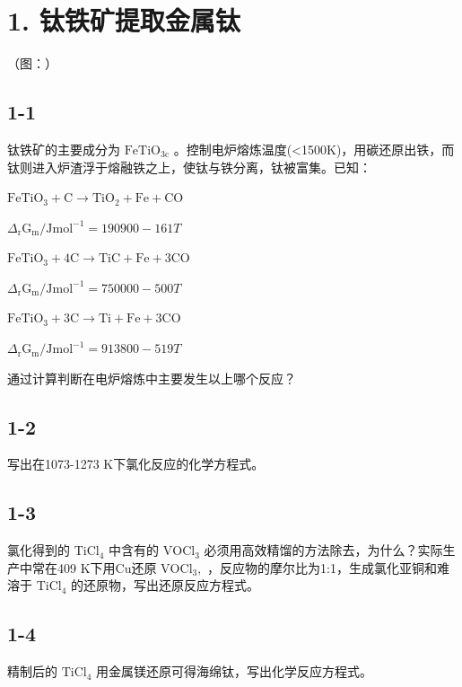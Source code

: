 \section*{1. 钛铁矿提取金属钛}
（图：）

\subsection*{1-1}
钛铁矿的主要成分为 $\mathrm { F e T i O _ { 3 \mathrm { c } } }$ 。控制电炉熔炼温度(<1500K)，⽤碳还原出铁，⽽钛则进⼊炉渣浮于熔融铁之上，使钛与铁分离，钛被富集。已知：

$
\mathrm{FeTiO} _ {3} + \mathrm{C} \rightarrow \mathrm{TiO} _ {2} + \mathrm{Fe} + \mathrm{CO}
$

$
\Delta_ {\mathrm{r}} \mathrm{G} _ {\mathrm{m}} / \mathrm{J} \mathrm{mol} ^ {- 1} = 1 9 0 9 0 0 - 1 6 1 T
$

$
\mathrm{FeTiO} _ {3} + 4 \mathrm{C} \rightarrow \mathrm{TiC} + \mathrm{Fe} + 3 \mathrm{CO}
$

$
\Delta_ {\mathrm{r}} \mathrm{G} _ {\mathrm{m}} / \mathrm{J} \mathrm{mol} ^ {- 1} = 7 5 0 0 0 0 - 5 0 0 T
$

$
\mathrm{FeTiO} _ {3} + 3 \mathrm{C} \rightarrow \mathrm{Ti} + \mathrm{Fe} + 3 \mathrm{CO}
$

$
\Delta_ {\mathrm{r}} \mathrm{G} _ {\mathrm{m}} / \mathrm{J} \mathrm{mol} ^ {- 1} = 9 1 3 8 0 0 - 5 1 9 T
$

通过计算判断在电炉熔炼中主要发⽣以上哪个反应？

\subsection*{1-2}
写出在1073-1273 K下氯化反应的化学⽅程式。

\subsection*{1-3}
氯化得到的 $\mathrm { T i C l _ { 4 } }$ 中含有的 $\mathrm { V O C l _ { 3 } }$ 必须⽤⾼效精馏的⽅法除去，为什么？实际⽣产中常在409 K下⽤Cu还原 $\mathrm { { V O C l } _ { 3 } } ,$ ，反应物的摩尔⽐为1:1，⽣成氯化亚铜和难溶于 $\mathrm { T i C l _ { 4 } }$ 的还原物，写出还原反应⽅程式。

\subsection*{1-4}
精制后的 $\mathrm { T i C l _ { 4 } }$ ⽤⾦属镁还原可得海绵钛，写出化学反应⽅程式。

